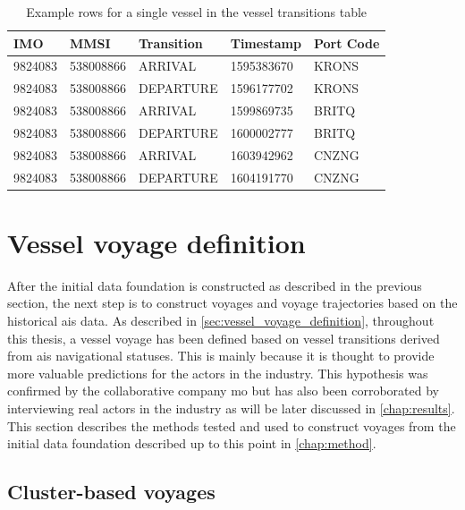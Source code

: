 \begin{table}[htbp]
    \centering
    \begin{tabular}{p{0.7in} p{0.9in} p{1in} p{1in} p{0.65in}}
    \hline
    \bfseries{IMO} & \bfseries{MMSI} & \bfseries{Transition} & \bfseries{Timestamp} & \bfseries{Port Code} \\ \hline
        9824083 & 538008866 & ARRIVAL   & 1595383670 & KRONS \\ \hline
        9824083 & 538008866 & DEPARTURE & 1596177702 & KRONS \\ \hline
        9824083 & 538008866 & ARRIVAL   & 1599869735 & BRITQ \\ \hline
        9824083 & 538008866 & DEPARTURE & 1600002777 & BRITQ \\ \hline
        9824083 & 538008866 & ARRIVAL   & 1603942962 & CNZNG \\ \hline
        9824083 & 538008866 & DEPARTURE & 1604191770 & CNZNG \\ \hline
    \end{tabular}
\caption{Example rows for a single vessel in the vessel transitions table}
\label{tab:vessel_transitions_example}
\end{table}

\section{Vessel voyage definition}

After the initial data foundation is constructed as described in the previous section, the next step is to construct voyages and voyage trajectories based on the historical \acrshort{ais} data. As described in \cref{sec:vessel_voyage_definition}, throughout this thesis, a vessel voyage has been defined based on vessel transitions derived from \acrshort{ais} navigational statuses. This is mainly because it is thought to provide more valuable predictions for the actors in the industry. This hypothesis was confirmed by the collaborative company \acrfull{mo} but has also been corroborated by interviewing real actors in the industry as will be later discussed in \cref{chap:results}. This section describes the methods tested and used to construct voyages from the initial data foundation described up to this point in \cref{chap:method}.

\subsection{Cluster-based voyages}
\label{sec:clustering}

